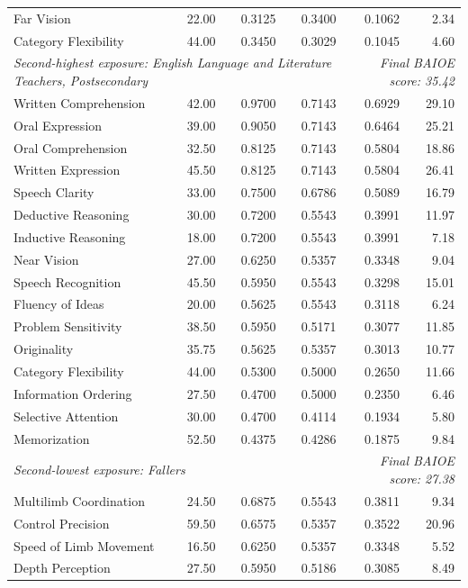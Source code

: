 \begin{longtable}{lrrrrr}
Far Vision & 22.00 & 0.3125 & 0.3400 & 0.1062 & 2.34 \\
Category Flexibility & 44.00 & 0.3450 & 0.3029 & 0.1045 & 4.60 \\
\multicolumn{4}{l}{\textit{Second-highest exposure: English Language and Literature Teachers, Postsecondary}} & \multicolumn{2}{r}{\textit{Final BAIOE score: 35.42}} \\
Written Comprehension & 42.00 & 0.9700 & 0.7143 & 0.6929 & 29.10 \\
Oral Expression & 39.00 & 0.9050 & 0.7143 & 0.6464 & 25.21 \\
Oral Comprehension & 32.50 & 0.8125 & 0.7143 & 0.5804 & 18.86 \\
Written Expression & 45.50 & 0.8125 & 0.7143 & 0.5804 & 26.41 \\
Speech Clarity & 33.00 & 0.7500 & 0.6786 & 0.5089 & 16.79 \\
Deductive Reasoning & 30.00 & 0.7200 & 0.5543 & 0.3991 & 11.97 \\
Inductive Reasoning & 18.00 & 0.7200 & 0.5543 & 0.3991 & 7.18 \\
Near Vision & 27.00 & 0.6250 & 0.5357 & 0.3348 & 9.04 \\
Speech Recognition & 45.50 & 0.5950 & 0.5543 & 0.3298 & 15.01 \\
Fluency of Ideas & 20.00 & 0.5625 & 0.5543 & 0.3118 & 6.24 \\
Problem Sensitivity & 38.50 & 0.5950 & 0.5171 & 0.3077 & 11.85 \\
Originality & 35.75 & 0.5625 & 0.5357 & 0.3013 & 10.77 \\
Category Flexibility & 44.00 & 0.5300 & 0.5000 & 0.2650 & 11.66 \\
Information Ordering & 27.50 & 0.4700 & 0.5000 & 0.2350 & 6.46 \\
Selective Attention & 30.00 & 0.4700 & 0.4114 & 0.1934 & 5.80 \\
Memorization & 52.50 & 0.4375 & 0.4286 & 0.1875 & 9.84 \\
\multicolumn{4}{l}{\textit{Second-lowest exposure: Fallers}} & \multicolumn{2}{r}{\textit{Final BAIOE score: 27.38}} \\
Multilimb Coordination & 24.50 & 0.6875 & 0.5543 & 0.3811 & 9.34 \\
Control Precision & 59.50 & 0.6575 & 0.5357 & 0.3522 & 20.96 \\
Speed of Limb Movement & 16.50 & 0.6250 & 0.5357 & 0.3348 & 5.52 \\
Depth Perception & 27.50 & 0.5950 & 0.5186 & 0.3085 & 8.49 \\

\end{longtable}

